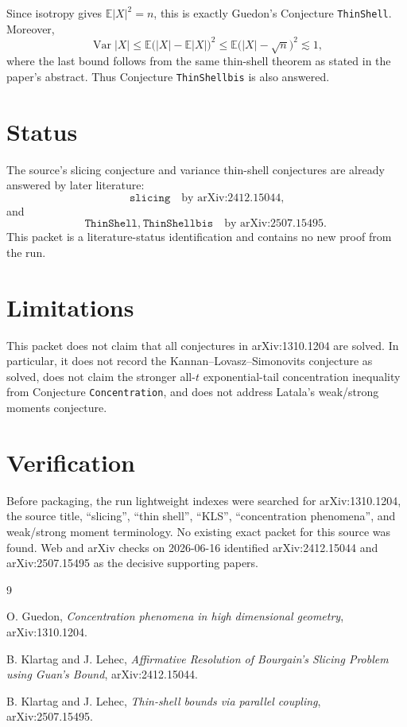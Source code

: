 \documentclass[11pt]{article}
\begin{document}
Since isotropy gives \(\mathbb{E}|X|^2=n\), this is exactly Guedon's
Conjecture \texttt{ThinShell}.  Moreover,
\[
  \operatorname{Var}|X|
  \le \mathbb{E}\bigl(|X|-\mathbb{E}|X|\bigr)^2
  \le \mathbb{E}\bigl(|X|-\sqrt n\bigr)^2
  \lesssim 1,
\]
where the last bound follows from the same thin-shell theorem as stated in the
paper's abstract.  Thus Conjecture \texttt{ThinShellbis} is also answered.

\section*{Status}

The source's slicing conjecture and variance thin-shell conjectures are
already answered by later literature:
\[
  \texttt{slicing}
  \quad\text{by arXiv:2412.15044,}
\]
and
\[
  \texttt{ThinShell},\ \texttt{ThinShellbis}
  \quad\text{by arXiv:2507.15495.}
\]
This packet is a literature-status identification and contains no new proof
from the run.

\section*{Limitations}

This packet does not claim that all conjectures in arXiv:1310.1204 are solved.
In particular, it does not record the Kannan--Lovasz--Simonovits conjecture as
solved, does not claim the stronger all-\(t\) exponential-tail concentration
inequality from Conjecture \texttt{Concentration}, and does not address
Latala's weak/strong moments conjecture.

\section*{Verification}

Before packaging, the run lightweight indexes were searched for arXiv:1310.1204,
the source title, ``slicing'', ``thin shell'', ``KLS'', ``concentration
phenomena'', and weak/strong moment terminology.  No existing exact packet for
this source was found.  Web and arXiv checks on 2026-06-16 identified
arXiv:2412.15044 and arXiv:2507.15495 as the decisive supporting papers.

\begin{thebibliography}{9}

O. Guedon,
\emph{Concentration phenomena in high dimensional geometry},
arXiv:1310.1204.

B. Klartag and J. Lehec,
\emph{Affirmative Resolution of Bourgain's Slicing Problem using Guan's
Bound},
arXiv:2412.15044.

B. Klartag and J. Lehec,
\emph{Thin-shell bounds via parallel coupling},
arXiv:2507.15495.

\end{thebibliography}
\end{document}
